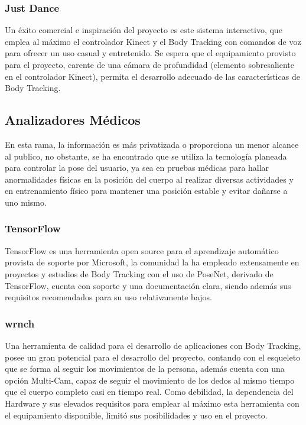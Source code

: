 \subsubsection{Just Dance}

Un éxito comercial e inspiración del proyecto es este sistema interactivo, que emplea al máximo el controlador Kinect y el Body Tracking con comandos de voz para ofrecer un uso casual y entretenido. Se espera que el equipamiento provisto para el proyecto, carente de una cámara de profundidad (elemento sobresaliente en el controlador Kinect), permita el desarrollo adecuado de las características de Body Tracking.

\subsection{Analizadores Médicos}

En esta rama, la información es más privatizada o proporciona un menor alcance al publico, no obstante, se ha encontrado que se utiliza la tecnología planeada para controlar la pose del usuario, ya sea en pruebas médicas para hallar anormalidades físicas en la posición del cuerpo al realizar diversas actividades y en entrenamiento físico para mantener una posición estable y evitar dañarse a uno mismo.


\subsubsection{TensorFlow}

TensorFlow es una herramienta open source para el aprendizaje automático provista de soporte por Microsoft, la comunidad la ha empleado extensamente en proyectos y estudios de Body Tracking con el uso de PoseNet, derivado de TensorFlow, cuenta con soporte y una documentación clara, siendo además sus requisitos recomendados para su uso relativamente bajos.

\subsubsection{wrnch}

Una herramienta de calidad para el desarrollo de aplicaciones con Body Tracking, posee un gran potencial para el desarrollo del proyecto, contando con el esqueleto que se forma al seguir los movimientos de la persona, además cuenta con una opción Multi-Cam, capaz de seguir el movimiento de los dedos al mismo tiempo que el cuerpo completo casi en tiempo real. Como debilidad, la dependencia del Hardware y sus elevados requisitos para emplear al máximo esta herramienta con el equipamiento disponible, limitó sus posibilidades y uso en el proyecto.


















